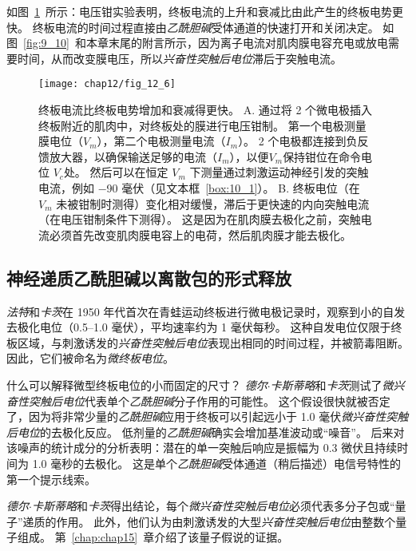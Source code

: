 如图~\ref{fig:12_6}~所示：电压钳实验表明，终板电流的上升和衰减比由此产生的终板电势更快。
终板电流的时间过程直接由\textit{乙酰胆碱}受体通道的快速打开和关闭决定。
如图~\ref{fig:9_10}~和本章末尾的附言所示，因为离子电流对肌肉膜电容充电或放电需要时间，从而改变膜电压，所以\textit{兴奋性突触后电位}滞后于突触电流。


\begin{figure}[htbp]
	\centering
	\texttt{[image: chap12/fig\_12\_6]}
	\caption{终板电流比终板电势增加和衰减得更快。
		A. 通过将 2 个微电极插入终板附近的肌肉中，对终板处的膜进行电压钳制。
		第一个电极测量膜电位（$V_m$），第二个电极测量电流（$I_m$）。
		2 个电极都连接到负反馈放大器，以确保输送足够的电流（$I_m$），以便$V_m$保持钳位在命令电位 $V_c$处。
		然后可以在恒定 $V_m$ 下测量通过刺激运动神经引发的突触电流，例如 −90 毫伏（见文本框~\ref{box:10_1}）。
		B. 终板电位（在 $V_m$ 未被钳制时测得）变化相对缓慢，滞后于更快速的内向突触电流（在电压钳制条件下测得）。
		这是因为在肌肉膜去极化之前，突触电流必须首先改变肌肉膜电容上的电荷，然后肌肉膜才能去极化。}
	\label{fig:12_6}
\end{figure}



\subsection{神经递质乙酰胆碱以离散包的形式释放}

\textit{法特}和\textit{卡茨}在 1950 年代首次在青蛙运动终板进行微电极记录时，观察到小的自发去极化电位（0.5–1.0 毫伏），平均速率约为 1 毫伏每秒。
这种自发电位仅限于终板区域，与刺激诱发的\textit{兴奋性突触后电位}表现出相同的时间过程，并被箭毒阻断。 
因此，它们被命名为\textit{微终板电位}。


什么可以解释微型终板电位的小而固定的尺寸？ 
\textit{德尔$\cdot$卡斯蒂略}和\textit{卡茨}测试了\textit{微兴奋性突触后电位}代表单个\textit{乙酰胆碱}分子作用的可能性。
这个假设很快就被否定了，因为将非常少量的\textit{乙酰胆碱}应用于终板可以引起远小于 1.0 毫伏\textit{微兴奋性突触后电位}的去极化反应。
低剂量的\textit{乙酰胆碱}确实会增加基准波动或“噪音”。
后来对该噪声的统计成分的分析表明：潜在的单一突触后响应是振幅为 0.3 微伏且持续时间为 1.0 毫秒的去极化。
这是单个\textit{乙酰胆碱}受体通道（稍后描述）电信号特性的第一个提示线索。


\textit{德尔$\cdot$卡斯蒂略}和\textit{卡茨}得出结论，每个\textit{微兴奋性突触后电位}必须代表多分子包或“量子”递质的作用。 
此外，他们认为由刺激诱发的大型\textit{兴奋性突触后电位}由整数个量子组成。 
第~\ref{chap:chap15}~章介绍了该量子假说的证据。



